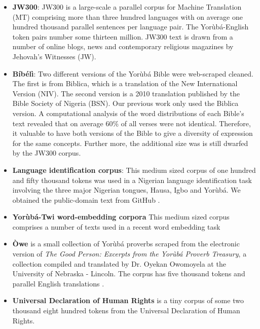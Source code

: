 \documentclass{article} %
\begin{document}
\begin{itemize}

\item \textbf{JW300}: JW300 is a large-scale a parallel corpus for Machine Translation (MT) comprising more than three hundred languages with on average one hundred thousand parallel sentences per language pair. The Yor{\`u}b{\'a}-English token pairs number some thirteen million. JW300 text is drawn from a number of online blogs, news and contemporary religious magazines by Jehovah's Witnesses (JW).

\item \textbf{B{\'i}b{\'e}l{\`i}}: Two different versions of the Yor{\`u}b{\'a} Bible were web-scraped cleaned. The first is from Biblica, which is a translation of the New International Version (NIV). The second version is a 2010 translation published by the Bible Society of Nigeria (BSN). Our previous work only used the Biblica version. A computational analysis of the word distributions of each Bible's text revealed that on average 60\% of all verses were not identical. Therefore, it valuable to have both versions of the Bible to give a diversity of expression for the same concepts. Further more, the additional size was is still dwarfed by the JW300 corpus. 

\item \textbf{Language identification corpus}: This medium sized corpus of one hundred and fifty thousand tokens was used in a Nigerian language identification task involving the three major Nigerian tongues, Hausa, Igbo and Yor{\`u}b{\'a}. We obtained the public-domain text from GitHub \citep{Asubiaro_langid}.

\item \textbf{Yor{\`u}b{\'a}-Twi word-embedding corpora}
This medium sized corpus comprises a number of texts used in a recent word embedding task 

\item \textbf{{\`O}we} is a small collection of Yor{\`u}b{\'a} proverbs scraped from the electronic version of \emph{The Good Person: Excerpts from the Yor{\`u}b{\'a} Proverb Treasury}, a collection compiled and translated by Dr. Oyekan Owomoyela at the University of Nebraska - Lincoln. The corpus has five thousand tokens and parallel English translations \citep{oweyoruba}.

\item \textbf{Universal Declaration of Human Rights} is a tiny corpus of some two thousand eight hundred tokens from the Universal Declaration of Human Rights.


\end{itemize}
\end{document}
